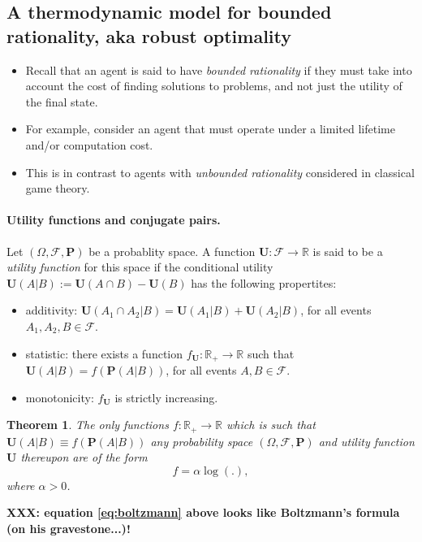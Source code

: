 \documentclass{article} %
\newtheorem{theorem}{Theorem} \newtheorem{lemma}[theorem]{Lemma}
\def\U{\mathbf{U}}
\def\P{\mathbf{P}}
\begin{document}
\subsection{A thermodynamic model for bounded rationality, aka robust optimality}
\begin{itemize}
  \item Recall that an agent is said to have \textit{bounded rationality} if they must take into account the cost of finding solutions to problems, and not just the utility of the final state.
  \item For example, consider an agent that must operate under a limited lifetime and/or computation cost.
  \item This is in contrast to agents with \textit{unbounded rationality} considered in classical game theory.
    \end{itemize}

\paragraph{Utility functions and conjugate pairs.}
  Let $(\Omega, \mathcal F, \P)$ be a probablity space. A function $\U: \mathcal F \rightarrow \mathbb R$ is said to be a \textit{utility function} for this space if the conditional utility $\U(A|B) := \U(A \cap B) - \U(B)$ has the following propertites:
  \begin{itemize}
  \item additivity: $\U(A_1 \cap A_2 | B) = \U(A_1|B) + \U(A_2|B)$, for all events $A_1, A_2, B \in \mathcal F$.    
  \item statistic: there exists a function $f_{\U} :\mathbb R_+ \rightarrow \mathbb R$ such that $\U(A|B) = f(\P(A|B))$, for all events
    $A,B \in \mathcal F$.
  \item monotonicity: $f_{\U}$ is strictly increasing.
    \end{itemize}

\begin{theorem}
  The only functions $f: \mathbb R_+ \rightarrow \mathbb R$ which is such that $\U(A|B) \equiv f(\P(A|B))$ any probability space $(\Omega, \mathcal F, \P)$ and utility function $\U$ thereupon are of the form
  \begin{equation}
    f = \alpha \log(.),
    \label{eq:boltzmann}
  \end{equation}
  where $\alpha > 0$.
\end{theorem}

\textbf{XXX: equation \eqref{eq:boltzmann} above looks like Boltzmann's formula (on his gravestone...)!}
\end{document}
